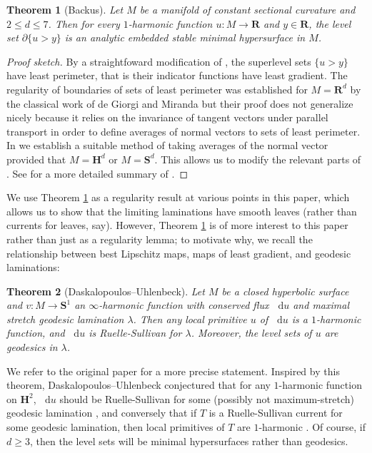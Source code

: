 \documentclass[reqno,11pt]{amsart}
\newcommand{\RR}{\mathbf{R}}
\newcommand{\Hyp}{\mathbf H}
\newcommand{\Sph}{\mathbf S}
\newcommand*\dif{\mathop{}\!\mathrm{d}}
\newtheorem{theorem}{Theorem}[section]
\theoremstyle{definition}
\numberwithin{equation}{section}
\begin{document}
\begin{theorem}[Backus]\label{main thm of old paper}
Let $M$ be a manifold of constant sectional curvature and $2 \leq d \leq 7$.
Then for every $1$-harmonic function $u: M \to \RR$ and $y \in \RR$, the level set $\partial \{u > y\}$ is an analytic embedded stable minimal hypersurface in $M$.
\end{theorem}
\begin{proof}[Proof sketch]
By a straightfoward modification of \cite[Theorem 1]{BOMBIERI1969}, the superlevel sets $\{u > y\}$ have least perimeter, that is their indicator functions have least gradient.
The regularity of boundaries of sets of least perimeter was established for $M = \RR^d$ by the classical work of de Giorgi and Miranda \cite{deGiorgi61, Miranda66} but their proof does not generalize nicely because it relies on the invariance of tangent vectors under parallel transport in order to define averages of normal vectors to sets of least perimeter.
In \cite[\S3]{BackusFLG} we establish a suitable method of taking averages of the normal vector provided that $M = \Hyp^d$ or $M = \Sph^d$.
This allows us to modify the relevant parts of \cite{Miranda66}.
See \cite[\S1]{BackusFLG} for a more detailed summary of \cite{BackusFLG}.
\end{proof}

We use Theorem \ref{main thm of old paper} as a regularity result at various points in this paper, which allows us to show that the limiting laminations have smooth leaves (rather than currents for leaves, say).
However, Theorem \ref{main thm of old paper} is of more interest to this paper rather than just as a regularity lemma; to motivate why, we recall the  relationship between best Lipschitz maps, maps of least gradient, and geodesic laminations:

\begin{theorem}[Daskalopoulos--Uhlenbeck]\label{DU theorem}
Let $M$ be a closed hyperbolic surface and $v: M \to \Sph^1$ an $\infty$-harmonic function with conserved flux $\dif u$ and maximal stretch geodesic lamination $\lambda$.
Then any local primitive $u$ of $\dif u$ is a $1$-harmonic function, and $\dif u$ is Ruelle-Sullivan for $\lambda$.
Moreover, the level sets of $u$ are geodesics in $\lambda$.
\end{theorem}

We refer to the original paper \cite{daskalopoulos2020transverse} for a more precise statement.
Inspired by this theorem, Daskalopoulos--Uhlenbeck conjectured that for any $1$-harmonic function on $\Hyp^2$, $\dif u$ should be Ruelle-Sullivan for some (possibly not maximum-stretch) geodesic lamination \cite[Problem 9.4]{daskalopoulos2020transverse}, and conversely that if $T$ is a Ruelle-Sullivan current for some geodesic lamination, then local primitives of $T$ are $1$-harmonic \cite[Conjecture 9.5]{daskalopoulos2020transverse}.
Of course, if $d \geq 3$, then the level sets will be minimal hypersurfaces rather than geodesics.
\end{document}
